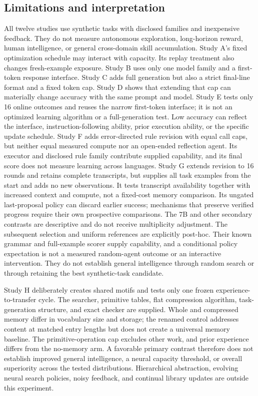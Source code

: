 \documentclass[11pt]{article}
\begin{document}
\subsection{Limitations and interpretation}
All twelve studies use synthetic tasks with disclosed families and inexpensive
feedback. They do not measure autonomous exploration, long-horizon reward,
human intelligence, or general cross-domain skill accumulation. Study A's
fixed optimization schedule may interact with capacity. Its replay treatment
also changes fresh-example exposure. Study B uses only one model family and
a first-token response interface. Study C adds full generation but also a
strict final-line format and a fixed token cap. Study D shows that extending that cap can materially
change accuracy with the same prompt and model. Study E tests only 16 online
outcomes and reuses the narrow first-token interface; it is not an optimized
learning algorithm or a full-generation test. Low accuracy can reflect the
interface, instruction-following ability, prior execution ability, or the
specific update schedule. Study F adds error-directed rule revision with
equal call caps, but neither equal measured compute nor an open-ended
reflection agent. Its executor and disclosed rule family contribute supplied
capability, and its final score does not measure learning across languages.
Study G extends revision to 16 rounds and retains complete transcripts,
but supplies all task examples from the start and adds no new observations.
It tests transcript availability together with increased context and compute,
not a fixed-cost memory comparison. Its ungated last-proposal policy can
discard earlier success; mechanisms that preserve verified progress require
their own prospective comparisons. The 7B and other secondary contrasts are
descriptive and do not receive multiplicity adjustment.
The subsequent selection and uniform references are explicitly post-hoc.
Their known grammar and full-example scorer supply capability, and a
conditional policy expectation is not a measured random-agent outcome or
an interactive intervention. They do not establish general intelligence
through random search or through retaining the best synthetic-task candidate.

Study H deliberately creates shared motifs and tests only one frozen
experience-to-transfer cycle. The searcher, primitive tables, flat compression
algorithm, task-generation structure, and exact checker are supplied. Whole
and compressed memory differ in vocabulary size and storage; the renamed
control addresses content at matched entry lengths but does not create a
universal memory baseline. The primitive-operation cap excludes other work,
and prior experience differs from the no-memory arm. A favorable primary
contrast therefore does not establish improved general intelligence, a neural
capacity threshold, or overall superiority across the tested distributions.
Hierarchical abstraction, evolving neural search policies, noisy feedback,
and continual library updates are outside this experiment.
\end{document}
